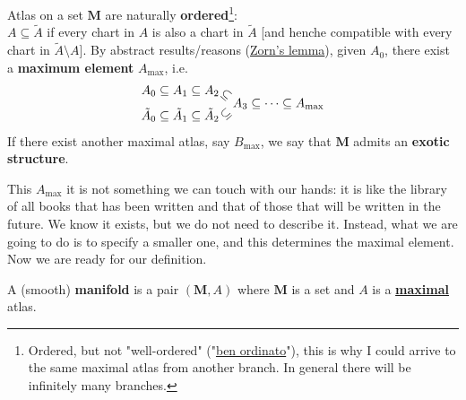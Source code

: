 \documentclass[../main.tex]{subfiles}
\begin{document}
\begin{kaobox}[frametitle=Remark]
Atlas on a set $\mathbf{M}$ are naturally \textbf{ordered}\footnote{Ordered, but not "well-ordered" ("\href{https://it.wikipedia.org/wiki/Buon_ordine}{ben ordinato}"), this is why I could arrive to the same maximal atlas from another branch. In general there will be infinitely many branches.}:\\
$A\subseteq \tilde{A}$ if every chart in $A$ is also a chart in $\tilde{A}$ [and henche compatible with every chart in $\tilde{A}\setminus A$]. By abstract results/reasons (\href{https://it.wikipedia.org/wiki/Lemma_di_Zorn}{Zorn's lemma}), given $A_0$, there exist a \textbf{maximum element} $A_{\textrm{max}}$, i.e.
\[
\begin{split}
    A_0 \subseteq A_1 \subseteq A_2  \rotatebox{-40}{$\subseteq$}\\
    \tilde{A}_0 \subseteq \tilde{A}_1 \subseteq \tilde{A}_2 \rotatebox{40}{$\subseteq$}
\end{split}
 A_3 \subseteq \dots \subseteq A_{\textrm{max}}
\]
If there exist another maximal atlas, say $B_{\textrm{max}}$, we say that $\mathbf{M}$ admits an \textbf{exotic structure}.
\end{kaobox}
This $A_{\textrm{max}}$ it is not something we can touch with our hands: it is like the library of all books that has been written and that of those that will be written in the future. We know it exists, but we do not need to describe it. Instead, what we are going to do is to specify a smaller one, and this determines the maximal element. Now we are ready for our definition.
\begin{definition}
A (smooth) \textbf{manifold}  is a pair $(\mathbf{M},A)$ where $\mathbf{M}$ is a set and $A$ is a \underline{\textbf{maximal}} atlas.
\end{definition}
\end{document}
